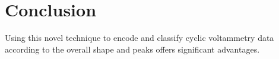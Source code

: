 \chapter{Conclusion} \label{chap:chap-5}
Using this novel technique to encode and classify cyclic voltammetry data according to the overall shape and peaks offers significant advantages. 